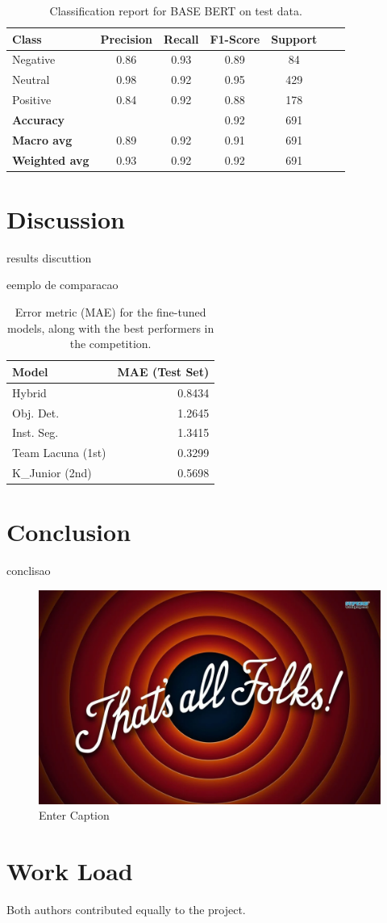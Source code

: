 \documentclass[conference]{IEEEtran}
\begin{document}
\begin{table}[H]
\centering
\caption{Classification report for BASE BERT on test data.}
\label{cr_basebert_test}
\begin{tabular}{lcccccc}
\toprule
\textbf{Class} & \textbf{Precision} & \textbf{Recall} & \textbf{F1-Score} & \textbf{Support} \\
\midrule
Negative & 0.86 & 0.93 & 0.89 & 84 \\
Neutral & 0.98 & 0.92 & 0.95 & 429 \\
Positive & 0.84 & 0.92 & 0.88 & 178 \\
\midrule
\textbf{Accuracy} &  &  & 0.92 & 691 \\
\textbf{Macro avg} & 0.89 & 0.92 & 0.91 & 691 \\
\textbf{Weighted avg} & 0.93 & 0.92 & 0.92 & 691 \\
\bottomrule
\end{tabular}
\end{table}


\section{Discussion}

results discuttion

eemplo de comparacao

\begin{table}[H]
\centering
\caption{Error metric (MAE) for the fine-tuned models, along with the best performers in the competition.}
\label{tab:model02_results_transposed}
\begin{tabular}{lr}
\toprule
\textbf{Model} & \textbf{MAE (Test Set)} \\
\midrule
Hybrid & 0.8434 \\
Obj. Det. & 1.2645 \\
Inst. Seg. & 1.3415 \\
Team Lacuna (1st) & 0.3299 \\
K\_Junior (2nd) & 0.5698 \\
\bottomrule
\end{tabular}
\end{table}




\section{Conclusion}

conclisao

\begin{figure}[H]
    \centering
    \includegraphics[width=0.5\linewidth]{image.png}
    \caption{Enter Caption}
    \label{fig:enter-label}
\end{figure}
\section*{Work Load}

Both authors contributed equally to the project.



\end{document}
